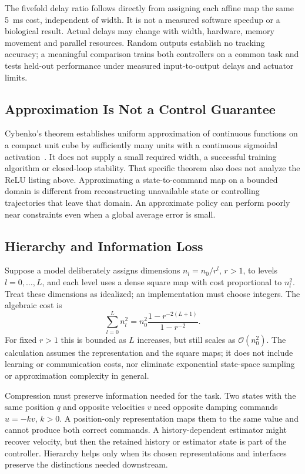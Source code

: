 The fivefold delay ratio follows directly from assigning each affine map the
same 5~ms cost, independent of width. It is not a measured software speedup or
a biological result. Actual delays may change with width, hardware, memory
movement and parallel resources. Random outputs establish no tracking accuracy;
a meaningful comparison trains both controllers on a common task and tests
held-out performance under measured input-to-output delays and actuator limits.

\subsection{Approximation Is Not a Control Guarantee}

Cybenko's theorem establishes uniform approximation of continuous functions on
a compact unit cube by sufficiently many units with a continuous sigmoidal
activation~\cite{cybenko1989review}. It does not supply a small required width,
a successful training algorithm or closed-loop stability. That specific theorem
also does not analyze the ReLU listing above. Approximating a state-to-command
map on a bounded domain is different from reconstructing unavailable state or
controlling trajectories that leave that domain. An approximate policy can
perform poorly near constraints even when a global average error is small.

\subsection{Hierarchy and Information Loss}

Suppose a model deliberately assigns dimensions $n_l=n_0/r^l$, $r>1$, to
levels $l=0,\ldots,L$, and each level uses a dense square map with cost
proportional to $n_l^2$. Treat these dimensions as idealized; an implementation
must choose integers. The algebraic cost is
\begin{equation}
 \sum_{l=0}^{L}n_l^2
 =n_0^2\frac{1-r^{-2(L+1)}}{1-r^{-2}}.
 \label{eq:ch4:hierarchical-dim}
\end{equation}
For fixed $r>1$ this is bounded as $L$ increases, but still scales as
$\mathcal{O}(n_0^2)$. The calculation assumes the representation and the square
maps; it does not include learning or communication costs, nor eliminate
exponential state-space sampling or approximation complexity in general.

Compression must preserve information needed for the task. Two states with the
same position $q$ and opposite velocities $v$ need opposite damping commands
$u=-kv$, $k>0$. A position-only representation maps them to the same value and
cannot produce both correct commands. A history-dependent estimator might
recover velocity, but then the retained history or estimator state is part of
the controller. Hierarchy helps only when its chosen representations and
interfaces preserve the distinctions needed downstream.

